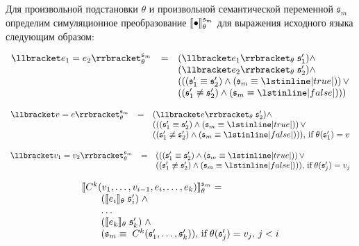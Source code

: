\begin{definition}
\normalfont Для произвольной подстановки $\theta$ и произвольной семантической переменной ${\mathfrak s}_m$ определим симуляционное преобразование $\llbracket{\bullet}\rrbracket^{{\mathfrak s}_m}_\theta$ для выражения исходного языка следующим образом:

$$
\begin{array}{rcl}
\sembr{e_1 = e_2}^{{\mathfrak s}_m}_\theta&=& (\sembr{e_1}_\theta\; {\mathfrak s}^\prime_1) \wedge \\
                           & & (\sembr{e_2}_\theta\; {\mathfrak s}^\prime_2) \wedge \\
                           & & ((({\mathfrak s}^\prime_1 \equiv {\mathfrak s}^\prime_2) \wedge ({\mathfrak s}_m \equiv \lstinline|true|))\, \vee \\
                           & & (({\mathfrak s}^\prime_1 \not \equiv {\mathfrak s}^\prime_2) \wedge ({\mathfrak s}_m \equiv \lstinline|false|)))
\end{array}
$$

$$
\begin{array}{rcl}
\sembr{v = e}^{{\mathfrak s}_m}_\theta&=& (\sembr{e}_\theta\; {\mathfrak s}^\prime_2) \wedge \\
                        & & ((({\mathfrak s}^\prime_1 \equiv {\mathfrak s}^\prime_2) \wedge ({\mathfrak s}_m \equiv \lstinline|true|))\, \vee \\
                        & & (({\mathfrak s}^\prime_1 \not \equiv {\mathfrak s}^\prime_2) \wedge ({\mathfrak s}_m \equiv \lstinline|false|))),\,\mbox{if}\;\theta({\mathfrak s}^\prime_1)=v
\end{array}
$$

$$
\begin{array}{rcl}
\sembr{v_1 = v_2}^{{\mathfrak s}_m}_\theta&=& ((({\mathfrak s}^\prime_1 \equiv {\mathfrak s}^\prime_2) \wedge ({\mathfrak s}_m \equiv \lstinline|true|))\, \vee \\
                           & & (({\mathfrak s}^\prime_1 \not \equiv {\mathfrak s}^\prime_2) \wedge ({\mathfrak s}_m \equiv \lstinline|false|))),\,\mbox{if}\;\theta({\mathfrak s}^\prime_j)=v_j
\end{array}
$$

$$
\begin{array}{l}
\llbracket{C^k(v_1, \ldots, v_{i-1}, e_i, \ldots, e_k)}\rrbracket^{{\mathfrak s}_m}_\theta=\\
\qquad(\llbracket{e_i}\rrbracket_\theta \; {\mathfrak s}^\prime_i) \; \wedge \\
\qquad\ldots  \\
\qquad(\llbracket{e_k}\rrbracket_\theta \; {\mathfrak s}^\prime_k) \; \wedge \\
\qquad({\mathfrak s}_m \equiv\; C^k({\mathfrak s}^\prime_1, \ldots, {\mathfrak s}^\prime_k)),\,\mbox{if}\;\theta({\mathfrak s}^\prime_j)=v_j,\,j<i
\end{array}
$$


\end{definition}

